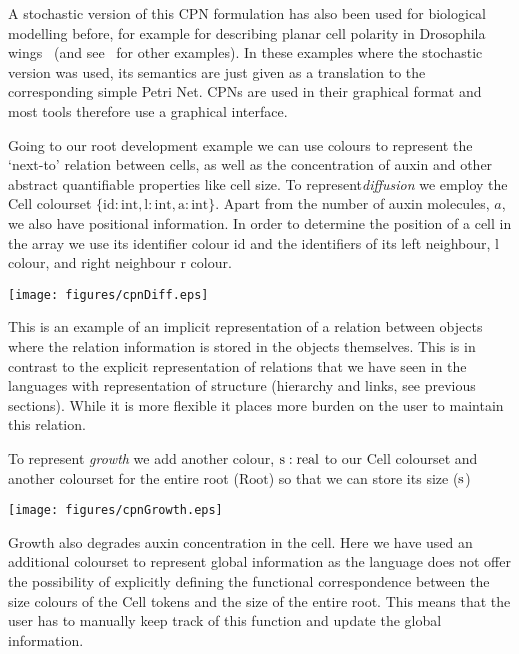 \documentclass[phd]{infthesis}
\newcommand{\mr}[1]{\mathrm{#1}}
\begin{document}
A stochastic version of this CPN formulation has also been used for biological
modelling before, for example for describing planar cell polarity in Drosophila
wings~\citep{gao_multiscale_2013} (and see~\citet{runge_application_2004,
gilbert_colouring_2013} for other examples). In these examples where the
stochastic version was used, its semantics are just given as a translation to
the corresponding simple Petri Net. CPNs are used in their graphical format and
most tools therefore use a graphical interface.

Going to our root development example we can use colours to represent the
`next-to' relation between cells, as well as the concentration of auxin and
other abstract quantifiable properties like cell size. To represent\emph{diffusion} we
employ the $\mr{Cell}$ colourset $\{\mr{id}: \mr{int}, \mr{l}:\mr{int},
\mr{a}:\mr{int} \} $. Apart from the number of auxin molecules, $a$, we also have
positional information. In order to determine the position of a cell in the
array we use its identifier colour $\mr{id}$ and the identifiers of its left
neighbour, $\mr{l}$ colour, and right neighbour $\mr{r}$ colour.
\begin{center}
    \texttt{[image: figures/cpnDiff.eps]}
\end{center}
This is an example of an implicit representation of a relation between objects
where the relation information is stored in the objects themselves. This is in
contrast to the explicit representation of relations that we have seen in the
languages with representation of structure (hierarchy and links, see
previous sections). While it is more flexible it places more burden on the user
to maintain this relation.

To represent \emph{growth} we add another colour,
$\mr{s}:\rm{real}$ to our $\mr{Cell}$ colourset and another colourset for the
entire root ($\mr{Root}$) so that we can store its size ($\rm{s}$)
\begin{center}
    \texttt{[image: figures/cpnGrowth.eps]}
\end{center}
Growth also degrades auxin concentration in the cell. Here we have used an
additional colourset to represent global information as the language does not
offer the possibility of explicitly defining the functional correspondence
between the size colours of the $\mr{Cell}$ tokens and the size of the entire
root. This means that the user has to manually keep track of this function and
update the global information.
\end{document}
